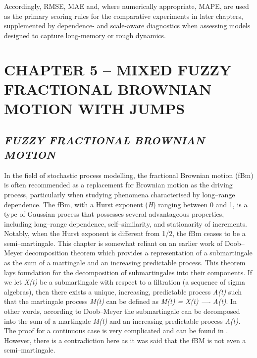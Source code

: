 \documentclass[12pt,a4paper]{report}
\numberwithin{equation}{section}
\begin{document}
Accordingly, RMSE, MAE and, where numerically appropriate, MAPE, are used as the primary scoring rules for the comparative experiments in later chapters, supplemented by dependence- and scale-aware diagnostics when assessing models designed to capture long-memory or rough dynamics.


\hypertarget{chapter--5--mixed--fuzzy--fractional--brownian--motion--with--jumps}{%
\chapter{\texorpdfstring{\textbf{CHAPTER 5 -- MIXED FUZZY FRACTIONAL
BROWNIAN MOTION WITH
JUMPS}}{CHAPTER 5 ---- MIXED FUZZY FRACTIONAL BROWNIAN MOTION WITH JUMPS}}\label{chapter--5--mixed--fuzzy--fractional--brownian--motion--with--jumps}}

\hypertarget{fuzzy--fractional--brownian--motion}{%
\section{\texorpdfstring{\emph{\textbf{FUZZY FRACTIONAL BROWNIAN
MOTION}}}{FUZZY FRACTIONAL BROWNIAN MOTION}}\label{fuzzy--fractional--brownian--motion}}

In the field of stochastic process modelling, the fractional Brownian
motion (fBm) is often recommended as a replacement for Brownian motion
as the driving process, particularly when studying phenomena
characterised by long--range dependence. The fBm, with a Hurst exponent
(\emph{H}) ranging between 0 and 1, is a type of Gaussian process that
possesses several advantageous properties, including long--range
dependence, self--similarity, and stationarity of increments. Notably,
when the Hurst exponent is different from 1/2, the fBm ceases to be a
semi--martingale. This chapter is somewhat reliant on an earlier work of
Doob--Meyer decomposition theorem which provides a representation of a
submartingale as the sum of a martingale and an increasing predictable
process. This theorem lays foundation for the decomposition of
submartingales into their components. If we let \emph{X(t)} be a
submartingale with respect to a filtration (a sequence of sigma
algebras), then there exists a unique, increasing, predictable process
\emph{A(t)} such that the martingale process \emph{M(t)} can be defined
as \emph{M(t) = X(t) ---- A(t)}. In other words, according to Doob--Meyer
the submartingale can be decomposed into the sum of a martingale
\emph{M(t)} and an increasing predictable process \emph{A(t).} The proof
for a continuous case is very complicated and can be found in \cite{meyer1962decomposition_75}.
However, there is a contradiction here as it was said that the fBM is
not even a semi--martingale.
\end{document}
